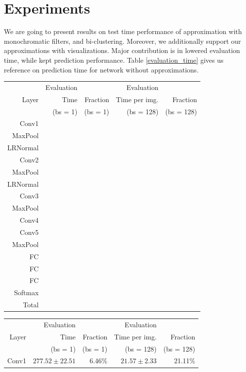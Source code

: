 \section{Experiments}

We are going to present results on test time performance of approximation with monochromatic filters, and bi-clustering. Moreover,
we additionally support our approximations with visualizations. Major contribution is in lowered evaluation time, while kept prediction performance.
Table \ref{evaluation_time} gives us reference on prediction time for network without approximations.

\begin{table}[t]
\tiny
\parbox{.99\linewidth}{
\centering
\begin{tabular}{rrrrr}
\hline
& Evaluation & & Evaluation &  \\
Layer & Time & Fraction & Time per img. & Fraction \\
& (bs = 1) & (bs = 1) & (bs = 128) & (bs = 128) \\
\hline
Conv1 & & & & \\
MaxPool & & & & \\
LRNormal & & & & \\
Conv2 & & & & \\
MaxPool & & & & \\
LRNormal & & & & \\
Conv3 & & & & \\
MaxPool & & & & \\
Conv4 & & & & \\
Conv5 & & & & \\
MaxPool & & & & \\
FC & & & & \\
FC & & & & \\
FC & & & & \\
Softmax & & & & \\
\hline 
Total & & & & \\
\hline
\end{tabular}
\vspace{5mm}
}
\parbox{.99\linewidth}{
\centering
\begin{tabular}{rrrrr}
\hline
& Evaluation & & Evaluation &  \\
Layer & Time & Fraction & Time per img. & Fraction \\
& (bs = 1) & (bs = 1) & (bs = 128) & (bs = 128) \\
\hline
Conv1 & $277.52 \pm 22.51$ & 6.46\% & $21.57 \pm 2.33$ & 21.11\% \\

\end{tabular}}
\end{table}
